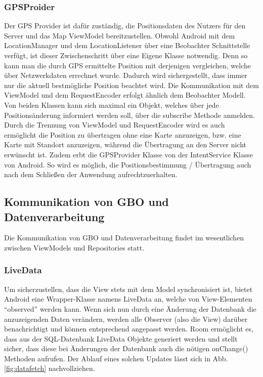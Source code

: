 \documentclass[parskip=full,11pt]{scrartcl}
\begin{document}
\pagebreak
\subsubsection{GPSProider}

Der GPS Provider ist dafür zuständig, die Positionsdaten des Nutzers für den
Server und das Map ViewModel bereitzustellen. Obwohl Android mit dem
LocationManager und dem LocationListener über eine Beobachter Schnittstelle
verfügt, ist dieser Zwischenschritt über eine Eigene Klasse notwendig. Denn so
kann man die durch GPS ermittelte Position mit derjenigen vergleichen, welche
über Netzwerkdaten errechnet wurde. Dadurch wird sichergestellt, dass immer
nur die aktuell bestmögliche Position beachtet wird. Die Kommunikation mit dem
ViewModel und dem RequestEncoder erfolgt ähnlich dem Beobachter Modell. Von
beiden Klassen kann sich maximal ein Objekt, welches über jede
Positionsänderung informiert werden soll, über die subscribe Methode anmelden.
Durch die Trennung von ViewModel und RequestEncoder wird es auch ermöglicht die
Position zu übertragen ohne eine Karte anzuzeigen, bzw. eine Karte mit Standort
anzuzeigen, während die Übertragung an den Server nicht erwünscht ist. Zudem
erbt die GPSProvider Klasse von der IntentService Klasse von Android. So wird es
möglich, die Positionsbestimmung / Übertragung auch nach dem Schließen der
Anwendung aufrechtzuerhalten.


\subsection{Kommunikation von GBO und Datenverarbeitung}
Die Kommunikation von GBO und Datenverarbeitung findet im wesentlichen zwischen
ViewModels und Repositories statt.

\subsubsection{LiveData} \label{sec:livedata}
Um sicherzustellen, dass die View stets mit dem Model synchronisiert ist,
bietet Android eine Wrapper-Klasse namens LiveData an, welche von View-Elementen
\enquote{observed} werden kann. Wenn sich nun durch eine Änderung der Datenbank
die anzuzeigenden Daten verändern, werden alle Observer (also die View) darüber
benachrichtigt und können entsprechend angepasst werden.
Room ermöglicht es, dass aus der SQL-Datenbank LiveData Objekte generiert
werden und stellt sicher, dass diese bei Änderungen der Datenbank auch die
nötigen onChange() Methoden aufrufen. Der Ablauf eines solchen Updates lässt
sich in Abb.\ref{fig:datafetch} nachvollziehen.
\end{document}
